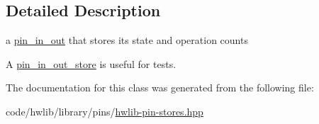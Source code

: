 \subsection{Detailed Description}
a \hyperlink{classhwlib_1_1pin__in__out}{pin\+\_\+in\+\_\+out} that stores its state and operation counts

A \hyperlink{classhwlib_1_1pin__in__out__store}{pin\+\_\+in\+\_\+out\+\_\+store} is useful for tests. 

The documentation for this class was generated from the following file\+:\begin{DoxyCompactItemize}
\item 
code/hwlib/library/pins/\hyperlink{hwlib-pin-stores_8hpp}{hwlib-\/pin-\/stores.\+hpp}\end{DoxyCompactItemize}
